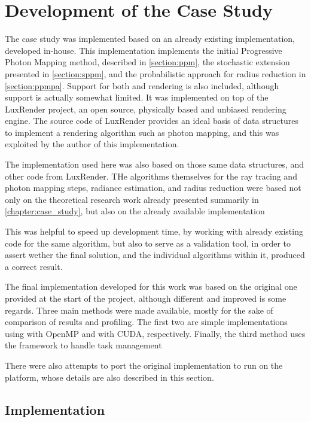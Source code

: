 \documentclass[main.tex]{subfiles}
\begin{document}
\chapter{Development of the Case Study} \label{section:impl}

The case study was implemented based on an already existing implementation, developed in-house. This implementation implements the initial Progressive Photon Mapping method, described in \cref{section:ppm}, the stochastic extension presented in \cref{section:sppm}, and the probabilistic approach for radius reduction in \cref{section:ppmpa}. Support for both \cpu and \cuda rendering is also included, although \cuda support is actually somewhat limited. It was implemented on top of the LuxRender project, an open source, physically based and unbiased rendering engine. The source code of LuxRender provides an ideal basis of data structures to implement a rendering algorithm such as photon mapping, and this was exploited by the author of this implementation.

The implementation used here was also based on those same data structures, and other code from LuxRender. THe algorithms themselves for the ray tracing and photon mapping steps, radiance estimation, and radius reduction were based not only on the theoretical research work already presented summarily in \cref{chapter:case_study}, but also on the already available implementation

This was helpful to speed up development time, by working with already existing code for the same algorithm, but also to serve as a validation tool, in order to assert wether the final solution, and the individual algorithms within it, produced a correct result.


The final implementation developed for this work was based on the original one provided at the start of the project, although different and improved is some regards. Three main methods were made available, mostly for the sake of comparison of results and profiling. The first two are simple implementations using \cpus with \acs{OpenMP} and \gpus with \acs{CUDA}, respectively. Finally, the third method uses the \starpu framework to handle task management

There were also attempts to port the original implementation to run on the \mic platform, whose details are also described in this section.


%

\section{Implementation}






\end{document}
